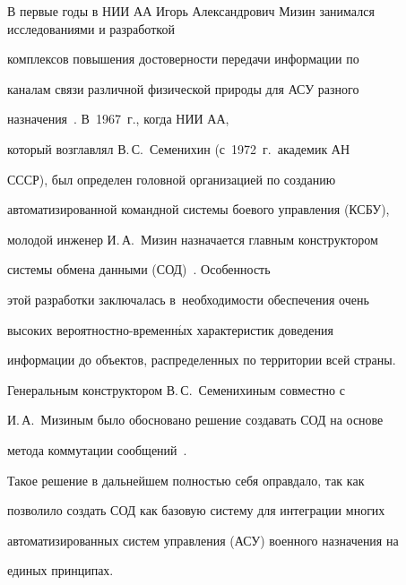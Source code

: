  \vspace*{-2pt}

 

   В первые годы в НИИ АА Игорь Александрович Мизин занимался исследованиями и разработкой 

комплексов повышения достоверности передачи информации по 

каналам связи различной физической природы для АСУ разного 

   назначения~\cite{16-sok, 17-sok}. В~1967~г., когда НИИ АА, 

который возглавлял В.\,С.~Семенихин (с~1972~г.\ академик АН 

СССР), был определен головной организацией по созданию 

автоматизированной командной системы боевого управления (КСБУ), 

молодой инженер И.\,А.~Мизин назначается главным конструктором 

системы обмена данными (СОД)~\cite{15-sok, 16-sok}. Особенность 

этой разработки заключалась в~необходимости обеспечения очень 

высоких вероятностно-временн$\acute{\mbox{ы}}$х характеристик доведения 

информации до объектов, распределенных по территории всей страны. 

Генеральным конструктором В.\,С.~Семенихиным совместно с 

И.\,А.~Мизиным было обосновано решение создавать СОД на основе 

метода коммутации сообщений~\cite{2-sok,  15-sok, 16-sok, 17-sok}. 

Такое решение в дальнейшем полностью себя оправдало, так как 

позволило создать СОД как базовую систему для интеграции многих 

автоматизированных сис\-тем управления (АСУ) военного назначения на 

единых принципах.



\def\leftkol{ИСТОРИЯ. ПАМЯТНЫЕ ДАТЫ. СОБЫТИЯ} %



\def\rightkol{\ ИСТОРИЯ. ПАМЯТНЫЕ ДАТЫ. СОБЫТИЯ} %



